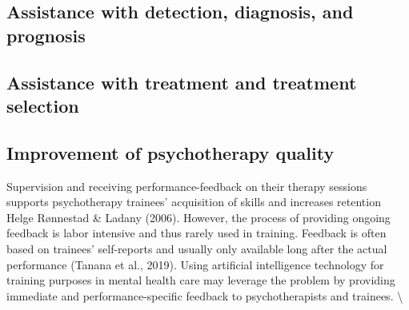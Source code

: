 \documentclass[
  man]{apa7}
\begin{document}
\hypertarget{assistance-with-detection-diagnosis-and-prognosis}{%
\subsection{Assistance with detection, diagnosis, and prognosis}\label{assistance-with-detection-diagnosis-and-prognosis}}

\hypertarget{assistance-with-treatment-and-treatment-selection}{%
\subsection{Assistance with treatment and treatment selection}\label{assistance-with-treatment-and-treatment-selection}}

\hypertarget{improvement-of-psychotherapy-quality}{%
\subsection{Improvement of psychotherapy quality}\label{improvement-of-psychotherapy-quality}}

Supervision and receiving performance-feedback on their therapy sessions supports psychotherapy trainees' acquisition of skills and increases retention Helge Rønnestad \& Ladany (2006).
However, the process of providing ongoing feedback is labor intensive and thus rarely used in training.
Feedback is often based on trainees' self-reports and usually only available long after the actual performance (Tanana et al., 2019).
Using artificial intelligence technology for training purposes in mental health care may leverage the problem by providing immediate and performance-specific feedback to psychotherapists and trainees. \textbackslash{}
\end{document}
